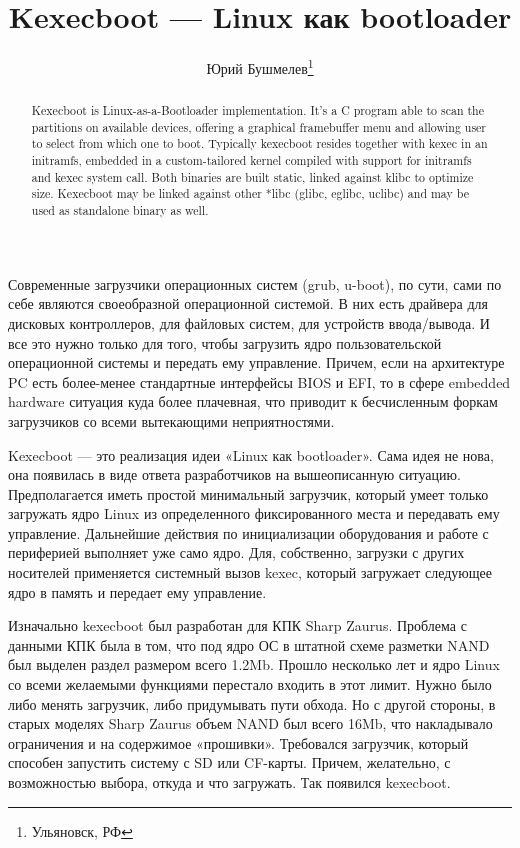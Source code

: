 \documentclass[10pt, a5paper]{article}
\begin{document}
\title{Kexecboot --- Linux как bootloader}%

\author{Юрий Бушмелев\footnote{Ульяновск, РФ}}
\maketitle

\begin{abstract}
Kexecboot is Linux-as-a-Bootloader implementation. It's a C program able to scan the partitions on available devices, offering a graphical framebuffer menu and allowing user to select from which one to boot.
Typically kexecboot resides together with kexec in an initramfs, embedded in a custom-tailored kernel compiled with support for initramfs and kexec system call. Both binaries are built static, linked against klibc to optimize size. Kexecboot may be linked against other *libc (glibc, eglibc, uclibc) and may be used as standalone binary as well.
\end{abstract}

Современные загрузчики операционных систем (grub, u-boot), по сути, сами по себе являются своеобразной операционной системой. В них есть драйвера для дисковых контроллеров, для файловых систем, для устройств ввода/вывода. И все это нужно только для того, чтобы загрузить ядро пользовательской операционной системы и передать ему управление. Причем, если на архитектуре PC есть более-менее стандартные интерфейсы BIOS и EFI, то в сфере embedded hardware ситуация куда более плачевная, что приводит к бесчисленным форкам загрузчиков со всеми вытекающими неприятностями.

Kexecboot --- это реализация идеи «Linux как bootloader». Сама идея не нова, она появилась в виде ответа разработчиков на вышеописанную ситуацию. Предполагается иметь простой минимальный загрузчик, который умеет только загружать ядро Linux из определенного фиксированного места и передавать ему управление. Дальнейшие действия по инициализации оборудования и работе с периферией выполняет уже само ядро. Для, собственно, загрузки с других носителей применяется системный вызов kexec, который загружает следующее ядро в память и передает ему управление.

Изначально kexecboot был разработан для КПК Sharp Zaurus. Проблема с данными КПК была в том, что под ядро ОС в штатной схеме разметки NAND был выделен раздел размером всего 1.2Mb. Прошло несколько лет и ядро Linux со всеми желаемыми функциями перестало входить в этот лимит. Нужно было либо менять загрузчик, либо придумывать пути обхода. Но с другой стороны, в старых моделях Sharp Zaurus объем NAND был всего 16Mb, что накладывало ограничения и на содержимое «прошивки». Требовался загрузчик, который способен запустить систему с SD или CF-карты. Причем, желательно, с возможностью выбора, откуда и что загружать. Так появился kexecboot.
\end{document}
